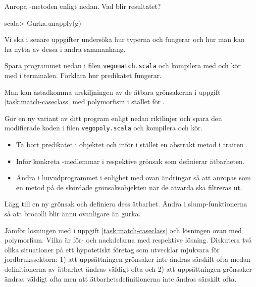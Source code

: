 \Subtask Anropa -metoden enligt nedan. Vad blir resultatet?
\begin{REPL}
scala> Gurka.unapply(g)   
\end{REPL}
Vi ska i senare uppgifter undersöka hur typerna  och  fungerar och hur man kan ha nytta av dessa i andra sammanhang.

\Subtask Spara programmet nedan i filen \texttt{vegomatch.scala} och kompilera med  och kör med  i terminalen. Förklara hur predikatet  fungerar. 



\Task Man kan åstadkomma urskiljningen av de ätbara grönsakerna i uppgift \ref{task:match-caseclass} med polymorfism i stället för . 

\Subtask Gör en ny variant av ditt program enligt nedan riktlinjer och spara den modifierade koden i filen \texttt{vegopoly.scala} och kompilera och kör.
\begin{itemize}[noitemsep]
\item Ta bort predikatet  i objektet  och inför i stället en abstrakt metod  i traiten .
\item Inför konkreta -medlemmar i respektive grönsak som definierar ätbarheten.
\item Ändra i huvudprogrammet i enlighet med ovan ändringar så att  anropas som en metod på de skördade grönsaksobjekten när de ätvarda ska filtreras ut.
\end{itemize} 

\Subtask Lägg till en ny grönsak  och definiera dess ätbarhet. Ändra i slump-funktionerna så att brocolli blir ännu ovanligare än gurka.

\Subtask\Pen Jämför lösningen med  i uppgift \ref{task:match-caseclass} och lösningen ovan med polymorfism. Vilka är för- och nackdelarna med respektive lösning. Diskutera två olika situationer på ett hypotetiskt företag som utvecklar mjukvara för jordbrukssektorn: 1) att uppsättningen grönsaker inte ändras särskilt ofta medan definitionerna av ätbarhet ändras väldigt ofta och 2) att uppsättningen grönsaker ändras väldigt ofta men att ätbarhetsdefinitionerna inte ändras särskilt ofta.



